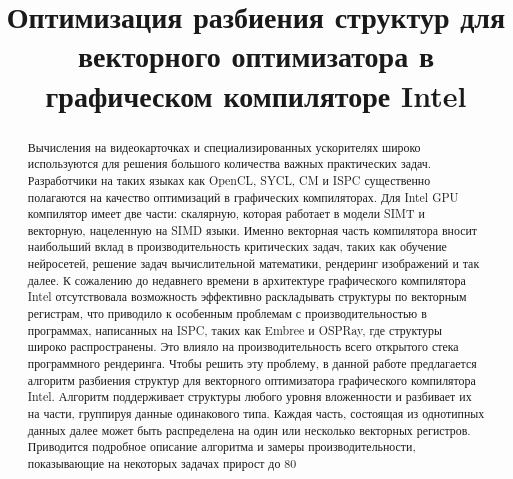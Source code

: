 \documentclass[conference,letterpaper]{IEEEtran}
\begin{document}

\title{Оптимизация разбиения структур для векторного оптимизатора в графическом компиляторе Intel\\
}
\author{
\IEEEauthorblockA{
\textit{}\\
\\}
}
\maketitle
\begin{abstract}
Вычисления на видеокарточках и специализированных ускорителях широко используются для решения большого количества важных практических задач. Разработчики на таких языках как OpenCL, SYCL, CM и ISPC существенно полагаются на качество оптимизаций в графических компиляторах. Для Intel GPU компилятор имеет две части: скалярную, которая работает в модели SIMT и векторную, нацеленную на SIMD языки. Именно векторная часть компилятора вносит наибольший вклад в производительность критических задач, таких как обучение нейросетей, решение задач вычислительной математики, рендеринг изображений и так далее. К сожалению до недавнего времени в архитектуре графического компилятора Intel отсутствовала возможность эффективно раскладывать структуры по векторным регистрам, что приводило к особенным проблемам с производительностью в программах, написанных на ISPC, таких как Embree и OSPRay, где структуры широко распространены. Это влияло на производительность всего открытого стека программного рендеринга. Чтобы решить эту проблему, в данной работе предлагается алгоритм разбиения структур для векторного оптимизатора графического компилятора Intel. Алгоритм поддерживает структуры любого уровня вложенности и разбивает их на части, группируя данные одинакового типа. Каждая часть, состоящая из однотипных данных далее может быть распределена на один или несколько векторных регистров. Приводится подробное описание алгоритма и замеры производительности, показывающие на некоторых задачах прирост до 80%

\end{abstract}
\end{document}
